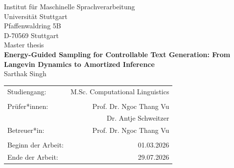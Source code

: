\documentclass[12pt,leqno,a4paper]{article}
\begin{document}
\begin{titlepage}
  \large
   \begin{center}
    Institut für Maschinelle Sprachverarbeitung\\
    Universität Stuttgart\\
    Pfaffenwaldring 5B\\
    D-70569 Stuttgart\\

    \vspace{2cm}
    Master thesis \\
    {\LARGE \bf Energy-Guided Sampling for Controllable Text Generation: From Langevin Dynamics to Amortized Inference} \\
    \vspace{1.5cm}
    Sarthak Singh\\
       \vfill
    \begin{tabular}[t]{lr}
    Studiengang: & M.Sc. Computational Linguistics \\
    \\
    {Prüfer*innen:} & Prof. Dr. Ngoc Thang Vu\\
     & Dr. Antje Schweitzer\\
    {Betreuer*in:} & Prof. Dr. Ngoc Thang Vu\\
    \\
    {Beginn der Arbeit:} & 01.03.2026\\ %
    {Ende der Arbeit:} & 29.07.2026\\
    \end{tabular}
  \end{center}
\setlength{\hoffset}{0cm}

  \normalsize
\end{titlepage}


\newpage
\thispagestyle{empty}
\end{document}
